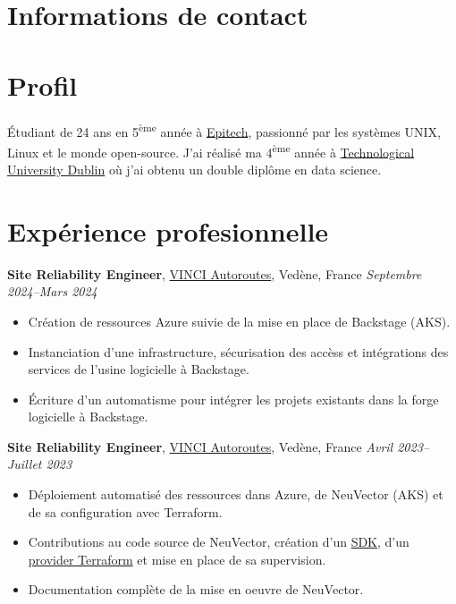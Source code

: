 \documentclass[margin,line]{../res}
\begin{document}
\newcommand{\myname}{Théo BORI}
\newlength{\mynamewidth}
\settowidth{\mynamewidth}{\namefont\myname}

\name{\hspace*{0.5\textwidth}\hspace{-0.5\mynamewidth} \myname \vspace*{.1in}}
\thispagestyle{empty}

\begin{resume}

	\section{\sc Informations de contact}
	


	\vspace{-1em}

	\section{\sc Profil}
	Étudiant de 24 ans en 5\textsuperscript{ème} année à \href{https://www.epitech.eu/}{Epitech}, passionné par les systèmes UNIX, Linux et le monde open-source. J'ai réalisé ma 4\textsuperscript{ème} année à \href{https://www.tudublin.ie/}{Technological University Dublin} où j'ai obtenu un double diplôme en data science.

	\section{\sc Expérience profesionnelle}
	 {\bf Site Reliability Engineer}, \href{https://www.vinci-autoroutes.com}{VINCI Autoroutes}, Vedène, France
	\hfill {\it Septembre 2024--Mars 2024}
	\vspace*{.05in}
	\begin{itemize}
		\item Création de ressources Azure suivie de la mise en place de Backstage (AKS).
		\item Instanciation d'une infrastructure, sécurisation des accèss et intégrations des services de l'usine logicielle à Backstage.
		\item \'Ecriture d'un automatisme pour intégrer les projets existants dans la forge logicielle à Backstage.
	\end{itemize}

	{\bf Site Reliability Engineer}, \href{https://www.vinci-autoroutes.com}{VINCI Autoroutes}, Vedène, France
	\hfill {\it Avril 2023--Juillet 2023}
	\vspace*{.05in}
	\begin{itemize}
		\item Déploiement automatisé des ressources dans Azure, de NeuVector (AKS) et de sa configuration avec Terraform.
		\item Contributions au code source de NeuVector, création d'un \href{https://github.com/theobori/go-neuvector}{SDK}, d'un \href{https://github.com/theobori/terraform-provider-neuvector}{provider Terraform} et mise en place de sa supervision.
		\item Documentation complète de la mise en oeuvre de NeuVector.
	\end{itemize}


\end{resume}
\end{document}
